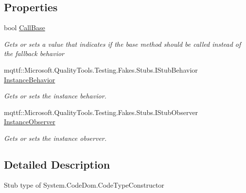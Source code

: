 \subsection*{Properties}
\begin{DoxyCompactItemize}
\item 
bool \hyperlink{class_system_1_1_code_dom_1_1_fakes_1_1_stub_code_type_constructor_a3e9d185492ac0b1967e3ea9849bb50bf}{Call\-Base}
\begin{DoxyCompactList}\small\item\em Gets or sets a value that indicates if the base method should be called instead of the fallback behavior\end{DoxyCompactList}\item 
mqttf\-::\-Microsoft.\-Quality\-Tools.\-Testing.\-Fakes.\-Stubs.\-I\-Stub\-Behavior \hyperlink{class_system_1_1_code_dom_1_1_fakes_1_1_stub_code_type_constructor_a6208442a3a34a2ff245fa5e7a3b64bd0}{Instance\-Behavior}
\begin{DoxyCompactList}\small\item\em Gets or sets the instance behavior.\end{DoxyCompactList}\item 
mqttf\-::\-Microsoft.\-Quality\-Tools.\-Testing.\-Fakes.\-Stubs.\-I\-Stub\-Observer \hyperlink{class_system_1_1_code_dom_1_1_fakes_1_1_stub_code_type_constructor_a62fd3382adb6fab7d966700a6801475b}{Instance\-Observer}
\begin{DoxyCompactList}\small\item\em Gets or sets the instance observer.\end{DoxyCompactList}\end{DoxyCompactItemize}


\subsection{Detailed Description}
Stub type of System.\-Code\-Dom.\-Code\-Type\-Constructor



